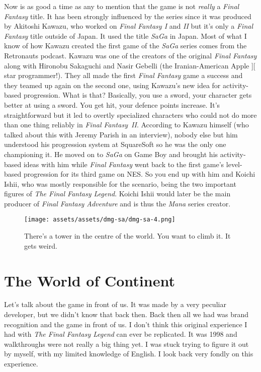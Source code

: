 \documentclass{book}
\begin{document}
Now is as good a time as any to mention that the game is not \emph{really} a \emph{Final Fantasy} title. It has been strongly influenced by the series since it was produced by Akitoshi Kawazu, who worked on \emph{Final Fantasy I} and \emph{II} but it’s only a \emph{Final Fantasy} title outside of Japan. It used the title \emph{SaGa} in Japan. Most of what I know of how Kawazu created the first game of the \emph{SaGa} series comes from the Retronauts podcast. Kawazu was one of the creators of the original \emph{Final Fantasy} along with Hironobu Sakaguchi and Nasir Gebelli (the Iranian-American Apple ][ star programmer!). They all made the first \emph{Final Fantasy} game a success and they teamed up again on the second one, using Kawazu’s new idea for activity-based progression. What is that? Basically, you use a sword, your character gets better at using a sword. You get hit, your defence points increase. It’s straightforward but it led to overtly specialized characters who could not do more than one thing reliably in \emph{Final Fantasy II}. According to Kawazu himself (who talked about this with Jeremy Parish in an interview), nobody else but him understood his progression system at SquareSoft so he was the only one championing it. He moved on to \emph{SaGa} on Game Boy and brought his activity-based ideas with him while \emph{Final Fantasy} went back to the first game’s level-based progression for its third game on NES. So you end up with him and Koichi Ishii, who was mostly responsible for the scenario, being the two important figures of \emph{The Final Fantasy Legend}. Koichi Ishii would later be the main producer of \emph{Final Fantasy Adventure} and is thus the \emph{Mana} series creator.

\begin{figure}[hbt]
\vskip 10pt
\centering \texttt{[image: assets/assets/dmg-sa/dmg-sa-4.png]}\par\pagetwodescription There’s a tower in the centre of the world. You want to climb it. It gets weird.
\vskip 6pt
\end{figure}

\FloatBarrier\needspace{5pt}\section*{The World of Continent}\nopagebreak[4]

Let’s talk about the game in front of us. It was made by a very peculiar developer, but we didn’t know that back then. Back then all we had was brand recognition and the game in front of us. I don’t think this original experience I had with \emph{The Final Fantasy Legend} can ever be replicated. It was 1998 and walkthroughs were not really a big thing yet. I was stuck trying to figure it out by myself, with my limited knowledge of English. I look back very fondly on this experience.
\end{document}
